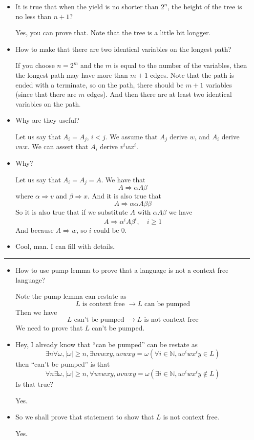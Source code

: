 \documentclass[../main.tex]{subfiles}
\begin{document}
\begin{itemize}
\item It is true that when the yield is no shorter than \( 2 ^{n}\),
the height of the tree is no less than \(n+1\)? 

Yes, you can prove that. Note that the tree is a little bit longger. 

\item How to make that there are two identical variables on the 
	longest path? 

If you choose \(n = 2 ^{m}\) and the \(m\) is equal to the number
of the variables, then the longest path may have more than \(m+1\) edges. 
Note that the path is ended with a terminate, so on the path, there should be \(m + 1\) variables (since that there are \(m\) edges).
And then there are at least two identical variables on the path. 

\item Why are they useful? 

Let us say that \(A _{i} = A_{j}\), \(i < j\). We assume that 
\(A _{j}\) derive \(w\), and \( A _{i}\) derive \(v w x\). 
We can assert that \(A_{i}\) derive \( v ^{i} w x ^{i}\). 

\item Why? 

Let us say that \(A_{i} = A_{j}= A\). We have that 
\[
A \Rightarrow\alpha A \beta 
\]
where \(\alpha \Rightarrow v \) and \(\beta \Rightarrow x\). 
And it is also true that 
\[
A \Rightarrow\alpha\alpha A \beta\beta
\]
So it is also true that if we substitute \(A\) with \(\alpha A\beta\) we have
\[
A \Rightarrow\alpha ^{i} A\beta ^{i} , \quad i \ge 1
\]
And because \( A \Rightarrow w\), so \(i\) could be \(0\).

\item Cool, man. I can fill with details.
\end{itemize}

\hrule

\begin{itemize}
\item How to use pump lemma to prove that a language is not a 
context free language? 

Note the pump lemma can restate as 
\[
	L \text{ is context free } \to L \text{ can be pumped}
\]
Then we have 
\[
	L \text{ can't be pumped } \to L \text{ is not context free}
\]
We need to prove that \(L\) can't be pumped. 

\item Hey, I already know that ``can be pumped'' can be 
restate as 
\[
\exists n \forall \omega, \vert \omega\vert \ge n, \exists uvwxy, uvwxy  = \omega (\forall i \in \mathbb{N} , u v ^{i} w  x ^{i} y  \in L)
\]
then ``can't be pumped'' is that 
\[
	\forall n \exists \omega ,\vert \omega \vert \ge n , \forall uvwxy , uvwxy  = \omega (\exists i \in \mathbb{N}, uv ^{i} w x ^{i} y \notin L)
\]
Is that true?

Yes. 
\item So we shall prove that statement to show that 
	\(L\) is not context free.

Yes.
\end{itemize}
\end{document}
